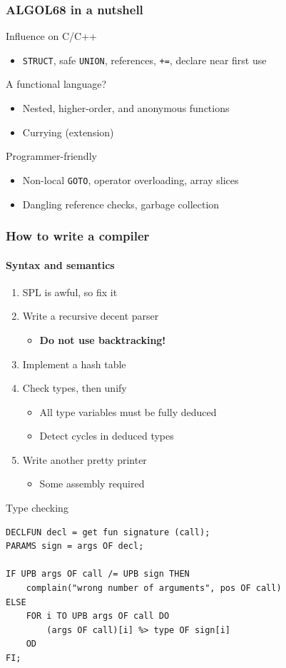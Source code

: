 \documentclass{beamer}
\begin{document}
\begin{frame}
\frametitle{ALGOL68 in a nutshell}
Influence on C/C++
\begin{itemize}
\item \texttt{STRUCT}, safe \texttt{UNION}, references, \texttt{+=}, declare near first use
\end{itemize}
A functional language?
\begin{itemize}
\item Nested, higher-order, and anonymous functions
\item Currying (extension)
\end{itemize}
Programmer-friendly
\begin{itemize}
\item Non-local \texttt{GOTO}, operator overloading, array slices
\item Dangling reference checks, garbage collection 
\end{itemize}
\end{frame}

\begin{frame}
\frametitle{How to write a compiler}
\framesubtitle{Syntax and semantics}
\begin{enumerate}
\item SPL is awful, so fix it
\item Write a recursive decent parser
\begin{itemize}
\item \textbf{Do not use backtracking!}
\end{itemize}
\item Implement a hash table
\item Check types, then unify
\begin{itemize}
\item All type variables must be fully deduced
\item Detect cycles in deduced types
\end{itemize}
\item Write another pretty printer
\begin{itemize}
\item Some assembly required
\end{itemize}
\end{enumerate}
\end{frame}

\begin{frame}[fragile]
\begin{block}{Type checking}
\begin{lstlisting}
DECLFUN decl = get fun signature (call);
PARAMS sign = args OF decl;

IF UPB args OF call /= UPB sign THEN
    complain("wrong number of arguments", pos OF call)
ELSE
    FOR i TO UPB args OF call DO
        (args OF call)[i] %> type OF sign[i]
    OD
FI;
\end{lstlisting}
\end{block}
\end{frame}
\end{document}
